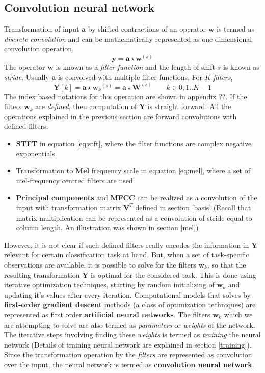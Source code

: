 \subsection{Convolution neural network}
\label{stacked}
Transformation of input $\textbf{a}$ by shifted contractions of an operator $\textbf{w}$ is termed as \textit{discrete convolution} and can be mathematically represented as one dimensional convolution operation, 
\[
	\textbf{y} = \textbf{a} \star \textbf{w}^{(s)}
\]   
The operator $\textbf{w}$ is known as a \textit{filter function} and the length of shift $s$ is known as \textit{stride}. Usually $\textbf{a}$ is convolved with multiple filter functions. For $K$ \textit{filters},
\[
	\textbf{Y}[k] = \textbf{a} \star {\textbf{w}_{k}}^{(s)} = \textbf{a} \star \textbf{W}^{(s)} \qquad k \in {0,1..K-1}
\] 
The index based notations for this operation are shown in appendix ??. If the filters $\textbf{w}_{k}$ are \textit{defined}, then computation of $\textbf{Y}$ is straight forward. All the operations explained in the previous section are forward convolutions with defined filters,
\begin{itemize}
\setlength\itemsep{0em}

\item \textbf{STFT} in equation \ref{eq:stft}, where the filter functions are complex negative exponentials.
\item Transformation to \textbf{Mel} frequency scale in equation \ref{eq:mel}, where a set of mel-frequency centred filters are used.
\item \textbf{Principal components} and \textbf{MFCC} can be realized as a convolution of the input with transformation matrix $\textbf{V}^{T}$ defined in section \ref{basis} (Recall that matrix multiplication can be represented as a convolution of stride equal to column length. An illustration was shown in section \ref{mel})  

\end{itemize}
However, it is not clear if such defined filters really encodes the information in $\textbf{Y}$ relevant for certain classification task at hand. But, when a set of task-specific observations are available, it is possible to solve for the filters $\textbf{w}_{k}$, so that the resulting transformation $\textbf{Y}$ is optimal for the considered task. This is done using iterative optimization techniques, starting by random initializing of $\textbf{w}_{k}$ and updating it's values after every iteration. Computational models that solves by \textbf{first-order gradient descent} methods (a class of optimization techniques) are represented as first order \textbf{artificial neural networks}. The filters $\textbf{w}_{k}$ which we are attempting to solve are also termed as \textit{parameters} or \textit{weights} of the network. The iterative steps involving finding these \textit{weights} is termed as \textit{training} the neural network (Details of training neural network are explained in section \ref{training}). Since the transformation operation by the \textit{filters} are represented as convolution over the input, the neural network is termed as \textbf{convolution neural network}.   

